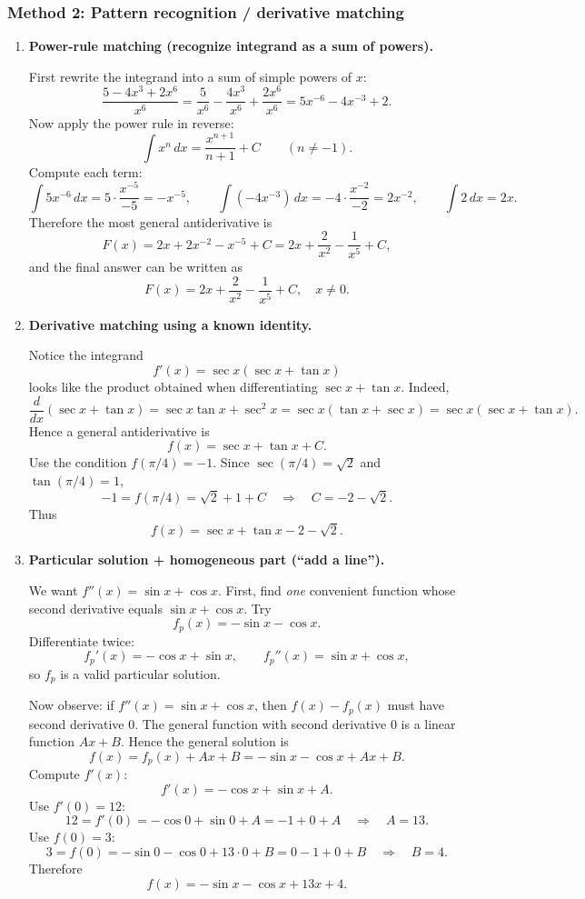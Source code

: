 \documentclass[12pt]{article}
\begin{document}

\subsubsection*{Method 2: Pattern recognition / derivative matching}

\begin{enumerate}[label=(\roman*)]

\item \textbf{Power-rule matching (recognize integrand as a sum of powers).}

First rewrite the integrand into a sum of simple powers of \(x\):
\[
\frac{5-4x^3+2x^6}{x^6}
= \frac{5}{x^6}-\frac{4x^3}{x^6}+\frac{2x^6}{x^6}
= 5x^{-6}-4x^{-3}+2.
\]
Now apply the power rule in reverse:
\[
\int x^n\,dx=\frac{x^{n+1}}{n+1}+C\qquad (n\neq -1).
\]
Compute each term:
\[
\int 5x^{-6}\,dx = 5\cdot \frac{x^{-5}}{-5} = -x^{-5},\qquad
\int (-4x^{-3})\,dx = -4\cdot \frac{x^{-2}}{-2}=2x^{-2},\qquad
\int 2\,dx = 2x.
\]
Therefore the most general antiderivative is
\[
F(x)=2x+2x^{-2}-x^{-5}+C
=2x+\frac{2}{x^2}-\frac{1}{x^5}+C,
\]
and the final answer can be written as
\[
\boxed{\,F(x)=2x+\frac{2}{x^2}-\frac{1}{x^5}+C,\quad x\neq 0.\,}
\]

\item \textbf{Derivative matching using a known identity.}

Notice the integrand
\[
f'(x)=\sec x(\sec x+\tan x)
\]
looks like the product obtained when differentiating \(\sec x+\tan x\). Indeed,
\[
\frac{d}{dx}(\sec x+\tan x)=\sec x\tan x+\sec^2 x=\sec x(\tan x+\sec x)=\sec x(\sec x+\tan x).
\]
Hence a general antiderivative is
\[
f(x)=\sec x+\tan x+C.
\]
Use the condition \(f(\pi/4)=-1\). Since \(\sec(\pi/4)=\sqrt{2}\) and \(\tan(\pi/4)=1\),
\[
-1=f(\pi/4)=\sqrt{2}+1+C
\quad\Rightarrow\quad
C=-2-\sqrt{2}.
\]
Thus
\[
\boxed{\,f(x)=\sec x+\tan x-2-\sqrt{2}.\,}
\]

\item \textbf{Particular solution + homogeneous part (``add a line'').}

We want \(f''(x)=\sin x+\cos x\). First, find \emph{one} convenient function whose second derivative equals \(\sin x+\cos x\).
Try
\[
f_p(x)=-\sin x-\cos x.
\]
Differentiate twice:
\[
f_p'(x)=-\cos x+\sin x,\qquad
f_p''(x)=\sin x+\cos x,
\]
so \(f_p\) is a valid particular solution.

Now observe: if \(f''(x)=\sin x+\cos x\), then \(f(x)-f_p(x)\) must have second derivative \(0\). The general function with second derivative \(0\) is a linear function \(Ax+B\). Hence the general solution is
\[
f(x)=f_p(x)+Ax+B=-\sin x-\cos x+Ax+B.
\]
Compute \(f'(x)\):
\[
f'(x)=-\cos x+\sin x + A.
\]
Use \(f'(0)=12\):
\[
12=f'(0)=-\cos 0+\sin 0 + A = -1+0+A
\quad\Rightarrow\quad
A=13.
\]
Use \(f(0)=3\):
\[
3=f(0)=-\sin 0-\cos 0+13\cdot 0 + B = 0-1+0+B
\quad\Rightarrow\quad
B=4.
\]
Therefore
\[
\boxed{\,f(x)=-\sin x-\cos x+13x+4.\,}
\]

\end{enumerate}
\end{document}
